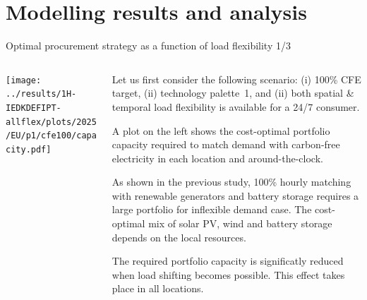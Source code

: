 \section{Modelling results and analysis}




\begin{frame}{Optimal procurement strategy as a function of load flexibility 1/3}

  {\footnotesize
  \vspace{0.2cm}
  
  \begin{columns}[T]
  \begin{column}{9cm}
  \centering
  
  \texttt{[image: ../results/1H-IEDKDEFIPT-allflex/plots/2025/EU/p1/cfe100/capacity.pdf]}
  \end{column}
  \begin{column}{6cm}
  
  Let us first consider the following scenario:
  (i) 100\% CFE target, (ii) technology palette~1, and (ii) both spatial \& temporal load flexibility is available for a 24/7 consumer.
  
  \vspace{0.1cm}
  A plot on the left shows the cost-optimal \alert{portfolio capacity} required to match demand with carbon-free electricity in each location and around-the-clock.
  
  \vspace{0.1cm}
  As shown in the previous study, 100\% hourly matching with renewable generators and battery storage requires a large portfolio for inflexible demand case. The cost-optimal mix of solar PV, wind and battery storage depends on the local resources.

  \vspace{0.1cm}
  The required portfolio capacity \alert{is significatly reduced when load shifting becomes possible}. This effect takes place in all locations.
  \end{column}
  \end{columns}
  }
\end{frame}


